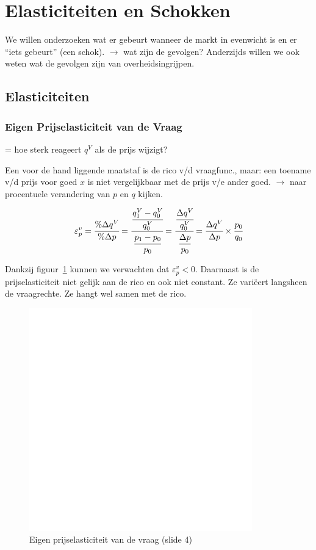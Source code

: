 \section{Elasticiteiten en Schokken}
We willen onderzoeken wat er gebeurt wanneer de markt in evenwicht is en er ``iets gebeurt'' (een schok). $\rightarrow$ wat zijn de gevolgen? Anderzijds willen we ook weten wat de gevolgen zijn van overheidsingrijpen.

\subsection{Elasticiteiten}
\subsubsection{Eigen Prijselasticiteit van de Vraag}
\label{sssec:PrijselastVanDeVraag}

= hoe sterk reageert $q^V$ als de prijs wijzigt?

Een voor de hand liggende maatstaf is de rico v/d vraagfunc., maar: een toename v/d prijs voor goed $x$ is niet vergelijkbaar met de prijs v/e ander goed. $\rightarrow$ naar procentuele verandering van $p$ en $q$ kijken.

\begin{equation}
	\varepsilon^{v}_{p} = 
    \cfrac{\% \Delta q^V}{\% \Delta p} = 
    \cfrac{\cfrac{q^{V}_{1} - q^{V}_{0}}{q_{0}^{V}}}{\cfrac{p_1 - p_0}{p_0}} = 
    \cfrac{\cfrac{\Delta q^V}{q_{0}^{V}}}{\cfrac{\Delta p}{p_0}} = 
    \cfrac{\Delta q^V}{\Delta p} \times \cfrac{p_0}{q_0}
    \label{eq:prijselasticiteitvandevraag}
\end{equation}


Dankzij figuur~\ref{fig:eigenPrijselasticiteitVanDeVraag} kunnen we verwachten dat $\varepsilon^{v}_{p} < 0$. Daarnaast is de prijselasticiteit niet gelijk aan de rico en ook niet constant. Ze vari\"{e}ert langsheen de vraagrechte. Ze hangt wel samen met de rico.
\begin{figure}[htbp]
	\centering
	\includegraphics[scale=0.4]{Images/white.png}
	\caption{Eigen prijselasticiteit van de vraag (slide 4)}
	\label{fig:eigenPrijselasticiteitVanDeVraag}
\end{figure}

